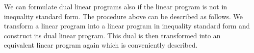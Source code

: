  We can formulate dual linear programs also if the linear program is
 not in inequality standard form. %
%
 The procedure above can be described as follows. We transform a linear
 program into a linear program in inequality  standard form and construct
 its dual linear program. This dual is then transformed into
 an equivalent  linear program again which is conveniently described. 

